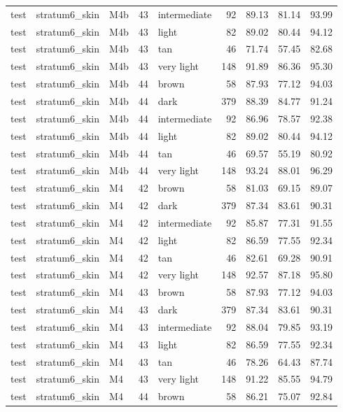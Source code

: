 \begin{tabular}{lllrlrrrr}
test & stratum6\_skin & M4b & 43 & intermediate & 92 & 89.13 & 81.14 & 93.99 \\
test & stratum6\_skin & M4b & 43 & light & 82 & 89.02 & 80.44 & 94.12 \\
test & stratum6\_skin & M4b & 43 & tan & 46 & 71.74 & 57.45 & 82.68 \\
test & stratum6\_skin & M4b & 43 & very light & 148 & 91.89 & 86.36 & 95.30 \\
test & stratum6\_skin & M4b & 44 & brown & 58 & 87.93 & 77.12 & 94.03 \\
test & stratum6\_skin & M4b & 44 & dark & 379 & 88.39 & 84.77 & 91.24 \\
test & stratum6\_skin & M4b & 44 & intermediate & 92 & 86.96 & 78.57 & 92.38 \\
test & stratum6\_skin & M4b & 44 & light & 82 & 89.02 & 80.44 & 94.12 \\
test & stratum6\_skin & M4b & 44 & tan & 46 & 69.57 & 55.19 & 80.92 \\
test & stratum6\_skin & M4b & 44 & very light & 148 & 93.24 & 88.01 & 96.29 \\
test & stratum6\_skin & M4 & 42 & brown & 58 & 81.03 & 69.15 & 89.07 \\
test & stratum6\_skin & M4 & 42 & dark & 379 & 87.34 & 83.61 & 90.31 \\
test & stratum6\_skin & M4 & 42 & intermediate & 92 & 85.87 & 77.31 & 91.55 \\
test & stratum6\_skin & M4 & 42 & light & 82 & 86.59 & 77.55 & 92.34 \\
test & stratum6\_skin & M4 & 42 & tan & 46 & 82.61 & 69.28 & 90.91 \\
test & stratum6\_skin & M4 & 42 & very light & 148 & 92.57 & 87.18 & 95.80 \\
test & stratum6\_skin & M4 & 43 & brown & 58 & 87.93 & 77.12 & 94.03 \\
test & stratum6\_skin & M4 & 43 & dark & 379 & 87.34 & 83.61 & 90.31 \\
test & stratum6\_skin & M4 & 43 & intermediate & 92 & 88.04 & 79.85 & 93.19 \\
test & stratum6\_skin & M4 & 43 & light & 82 & 86.59 & 77.55 & 92.34 \\
test & stratum6\_skin & M4 & 43 & tan & 46 & 78.26 & 64.43 & 87.74 \\
test & stratum6\_skin & M4 & 43 & very light & 148 & 91.22 & 85.55 & 94.79 \\
test & stratum6\_skin & M4 & 44 & brown & 58 & 86.21 & 75.07 & 92.84 \\

\end{tabular}
